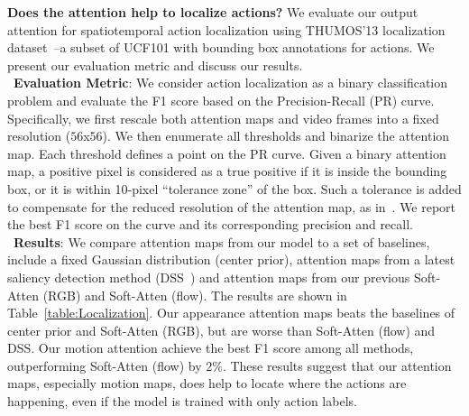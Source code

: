 \documentclass[10pt,twocolumn,letterpaper]{article}
\begin{document}
\noindent \textbf{Does the attention help to localize actions?} We evaluate our output attention for spatiotemporal action localization using THUMOS'13 localization dataset~\cite{idrees2017thumos}--a subset of UCF101 with bounding box annotations for actions. We present our evaluation metric and discuss our results.\\
\noindent \textbullet\ \textbf{Evaluation Metric}: We consider action localization as a binary classification problem and evaluate the F1 score based on the Precision-Recall (PR) curve. Specifically, we first rescale both attention maps and video frames into a fixed resolution ($56$x$56$). We then enumerate all thresholds and binarize the attention map. Each threshold defines a point on the PR curve. Given a binary attention map, a positive pixel is considered as a true positive if it is inside the bounding box, or it is within 10-pixel ``tolerance zone'' of the box. Such a tolerance is added to compensate for the reduced resolution of the attention map, as in~\cite{oquab2015object}. We report the best F1 score on the curve and its corresponding precision and recall.\\ 
\noindent \textbullet\ \textbf{Results}: We compare attention maps from our model to a set of baselines, include a fixed Gaussian distribution (center prior), attention maps from a latest saliency detection method (DSS~\cite{hou2017deeply}) and attention maps from our previous Soft-Atten (RGB) and Soft-Atten (flow). The results are shown in Table~\ref{table:Localization}. Our appearance attention maps beats the baselines of center prior and Soft-Atten (RGB), but are worse than Soft-Atten (flow) and DSS. Our motion attention achieve the best F1 score among all methods, outperforming Soft-Atten (flow) by $2\%$. These results suggest that our attention maps, especially motion maps, does help to locate where the actions are happening, even if the model is trained with only action labels.  
\end{document}
